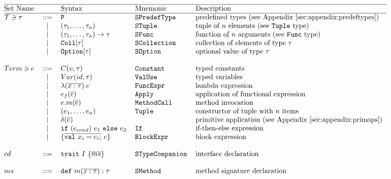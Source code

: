 \[\begin{tabular}{@{}l c l l l} 
\hline
Set Name				&  			& Syntax	& Mnemonic 		& Description \\
\hline
$\mathcal{T} \ni \tau$	& ::= 		& \lst{P} 	& \lst{SPredefType}	& predefined types (see Appendix~\ref{sec:appendix:predeftypes}) \\

			&	$\mid$	& $(\tau_1, \dots ,\tau_n) $	& \lst{STuple} & tuple of $n$ elements (see \lst{Tuple} type)\\

			&   $\mid$  & $(\tau_1,\dots,\tau_n) \to \tau $	& \lst{SFunc} & function of $n$ arguments (see \lst{Func} type) \\
			&   $\mid$  & $\text{\lst{Coll}}[\tau]$			& \lst{SCollection} & collection of elements of type $\tau$   \\
			&   $\mid$  & $\text{\lst{Option}}[\tau]$		& \lst{SOption} & optional value of type $\tau$  \\
			& 	     	&									& 				&		\\

$Term\ni e$	& ::= 		&   $C(v, \tau) $				& \lst{Constant} & typed constants  \\
			& 	$\mid$ 	& 	$Var(id, \tau) $ 			& \lst{ValUse} & typed variables  \\
			& 	$\mid$ 	& 	$\TyLam{x}{\tau}{e}$ 		& \lst{FuncExpr} & lambda expression \\
			& 	$\mid$ 	& 	$e_f(\Ov{e})$ 				& \lst{Apply} & application of functional expression \\
			& 	$\mid$ 	& 	$e.m(\Ov{e})$			 	& \lst{MethodCall} & method invocation  \\
			& 	$\mid$ 	&   $\Tup{e_1, \dots ,e_n}$ 	& \lst{Tuple} & constructor of tuple with $n$ items \\
			& 	$\mid$ 	& 	$\delta(\Ov{e})$ 			& & primitive application (see Appendix~\ref{sec:appendix:primops}) \\
			& 	$\mid$ 	& 	\lst{if} $(e_{cond})$ $e_1$ \lst{else} $e_2$ & \lst{If} & if-then-else expression \\
			& 	$\mid$ 	&   $\{ \Ov{\text{\lst{val}}~x_i = e_i;}~e\}$  & \lst{BlockExpr} & block expression \\
			& 	     	&										& &				\\
$cd$   		& ::= 		& 	$\Trait{I}{\Ov{ms}}$				& \lst{STypeCompanion} & interface declaration    \\
			& 	     	&										& &				\\
$ms$	   	& ::= 	& $\MSig{m}{\overline{x : \tau}}{\tau}$ 	& \lst{SMethod} & method signature declaration   \\
\end{tabular}\] 

